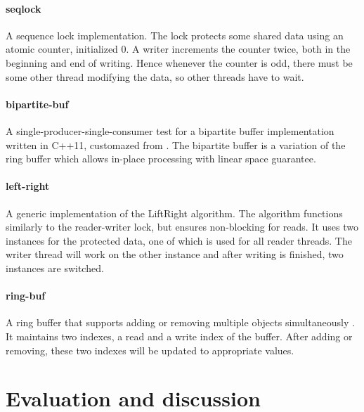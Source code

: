 \paragraph{seqlock} A sequence lock implementation. The lock protects some shared data using an atomic counter, initialized 0. A writer increments the counter twice, both in the beginning and end of writing. Hence whenever the counter is odd, there must be some other thread modifying the data, so other threads have to wait.

\paragraph{bipartite-buf} A single-producer-single-consumer test for a bipartite buffer implementation written in C++11, customazed from \cite{lockfree-DNedic}. The bipartite buffer is a variation of the ring buffer which allows in-place processing with linear space guarantee.

\paragraph{left-right} A generic implementation \cite{lockfree-xenium} of the LiftRight algorithm\cite{left-right}. The algorithm functions similarly to the reader-writer lock, but ensures non-blocking for reads. It uses two instances for the protected data, one of which is used for all reader threads. The writer thread will work on the other instance and after writing is finished, two instances are switched.


\paragraph{ring-buf} A ring buffer that supports adding or removing multiple objects simultaneously \cite{lockfree-DNedic}. It maintains two indexes, a read and a write index of the buffer. After adding or removing, these two indexes will be updated to appropriate values.



\section{Evaluation and discussion}




